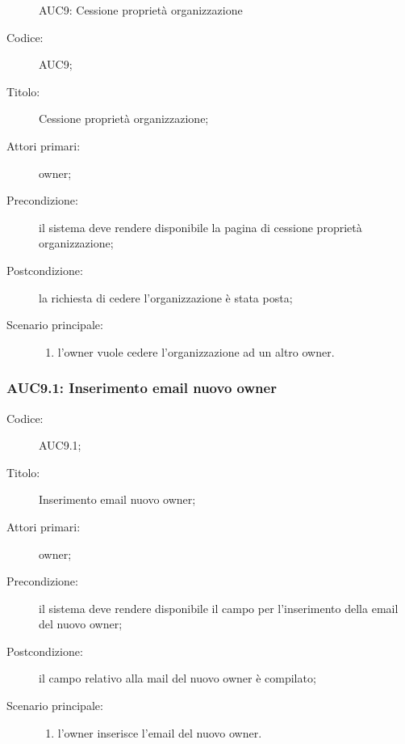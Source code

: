 \documentclass[../../../analisi-dei-requisiti.tex]{subfiles}
\begin{document}
\begin{figure}[H]
  \centering
  \caption{AUC9: Cessione proprietà organizzazione}%
  \label{fig:auc9}
\end{figure}

\begin{description}
  \item[Codice:] AUC9;
  \item[Titolo:] Cessione proprietà organizzazione;
  \item[Attori primari:] owner;
  \item[Precondizione:] il sistema deve rendere disponibile la pagina di cessione proprietà organizzazione;
  \item[Postcondizione:] la richiesta di cedere l'organizzazione è stata posta;
  \item[Scenario principale:]
  \begin{enumerate}
    \item l'owner vuole cedere l'organizzazione ad un altro owner.
  \end{enumerate}
\end{description}

\subsubsection{AUC9.1: Inserimento email nuovo owner}%
\label{subs:AUC9.1}
\begin{description}
  \item[Codice:] AUC9.1;
  \item[Titolo:] Inserimento email nuovo owner;
  \item[Attori primari:] owner;
  \item[Precondizione:] il sistema deve rendere disponibile il campo per l'inserimento della email del nuovo owner;
  \item[Postcondizione:] il campo relativo alla mail del nuovo owner è compilato;
  \item[Scenario principale:]
  \begin{enumerate}
    \item l'owner inserisce l'email del nuovo owner.
  \end{enumerate}
\end{description}
\end{document}
